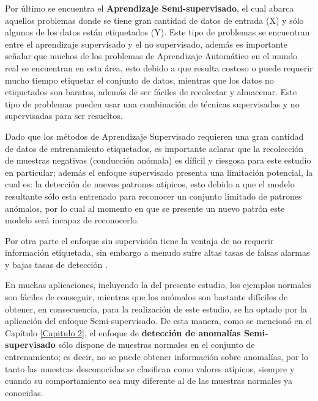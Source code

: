 Por \'{u}ltimo se encuentra el \textbf{Aprendizaje Semi-supervisado}, el cual abarca aquellos problemas donde se tiene gran cantidad de datos de entrada (X) y s\'{o}lo algunos de los datos est\'{a}n etiquetados (Y). Este tipo de problemas se encuentran entre el aprendizaje supervisado y el no supervisado, adem\'{a}s es importante se\~{n}alar que muchos de los problemas de Aprendizaje Autom\'{a}tico en el mundo real se encuentran en esta \'{a}rea, esto debido a que resulta costoso o puede requerir mucho tiempo etiquetar el conjunto de datos, mientras que los datos no etiquetados son baratos, adem\'{a}s de ser f\'{a}ciles de recolectar y almacenar. Este tipo de problemas pueden usar una combinaci\'{o}n de t\'{e}cnicas supervisadas y no supervisadas para ser resueltos.

\vspace{5mm} %

Dado que los m\'{e}todos de Aprendizaje Supervisado requieren una gran cantidad de datos de entrenamiento etiquetados, es importante aclarar que la recolecci\'{o}n de muestras negativas (conducci\'{o}n an\'{o}mala) es d\'{i}ficil y riesgosa para este estudio en particular; adem\'{a}s el enfoque supervisado presenta una limitaci\'{o}n potencial, la cual es: la detecci\'{o}n de nuevos patrones at\'{i}picos, esto debido a que el modelo resultante s\'{o}lo esta entrenado para reconocer un conjunto limitado de patrones an\'{o}malos, por lo cual al momento en que se presente un nuevo patr\'{o}n este modelo ser\'{a} incapaz de reconocerlo.

\vspace{5mm} %

Por otra parte el enfoque sin supervisi\'{o}n tiene la ventaja de no requerir informaci\'{o}n etiquetada, sin embargo a menudo sufre altas tasas de falsas alarmas y bajas tasas de detecci\'{o}n \cite{Reference33}. 

\vspace{5mm} %

En muchas aplicaciones, incluyendo la del presente estudio, los ejemplos normales son f\'{a}ciles de conseguir, mientras que los an\'{o}malos son bastante dif\'{i}ciles de obtener, en consecuencia, para la realizaci\'{o}n de este estudio, se ha optado por la aplicaci\'{o}n del enfoque Semi-supervisado. De esta manera, como se mencion\'{o} en el Cap\'{i}tulo \ref{Capitulo 2}, el enfoque de \textbf{detecci\'{o}n de anomal\'{i}as Semi-supervisado} s\'{o}lo dispone de muestras normales en el conjunto de entrenamiento; es decir, no se puede obtener informaci\'{o}n sobre anomal\'{i}as, por lo tanto las muestras desconocidas se clasifican como valores at\'{i}picos, siempre y cuando su comportamiento sea muy diferente al de las muestras normales ya conocidas.

